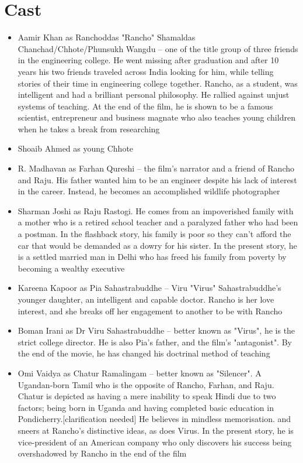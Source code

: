 \documentclass{article}
\begin{document}
\section{Cast}
\begin{itemize}
    \item{Aamir Khan as Ranchoddas "Rancho" Shamaldas Chanchad/Chhote/Phunsukh Wangdu – one of the title group of three friends in the engineering college. He went missing after graduation and after 10 years his two friends traveled across India looking for him, while telling stories of their time in engineering college together. Rancho, as a student, was intelligent and had a brilliant personal philosophy. He rallied against unjust systems of teaching. At the end of the film, he is shown to be a famous scientist, entrepreneur and business magnate who also teaches young children when he takes a break from researching}
    \item{Shoaib Ahmed as young Chhote}
    \item{R. Madhavan as Farhan Qureshi – the film's narrator and a friend of Rancho and Raju. His father wanted him to be an engineer despite his lack of interest in the career. Instead, he becomes an accomplished wildlife photographer}
    \item{Sharman Joshi as Raju Rastogi. He comes from an impoverished family with a mother who is a retired school teacher and a paralyzed father who had been a postman. In the flashback story, his family is poor so they can't afford the car that would be demanded as a dowry for his sister. In the present story, he is a settled married man in Delhi who has freed his family from poverty by becoming a wealthy executive}
    \item{Kareena Kapoor as Pia Sahastrabuddhe – Viru "Virus" Sahastrabuddhe's younger daughter, an intelligent and capable doctor. Rancho is her love interest, and she breaks off her engagement to another to be with Rancho}
    \item{Boman Irani as Dr Viru Sahastrabuddhe – better known as "Virus", he is the strict college director. He is also Pia's father, and the film's "antagonist". By the end of the movie, he has changed his doctrinal method of teaching}
    \item{Omi Vaidya as Chatur Ramalingam – better known as "Silencer". A Ugandan-born Tamil who is the opposite of Rancho, Farhan, and Raju. Chatur is depicted as having a mere inability to speak Hindi due to two factors; being born in Uganda and having completed basic education in Pondicherry.[clarification needed] He believes in mindless memorisation. and sneers at Rancho's distinctive ideas, as does Virus. In the present story, he is vice-president of an American company who only discovers his success being overshadowed by Rancho in the end of the film}

\end{itemize}
\end{document}
